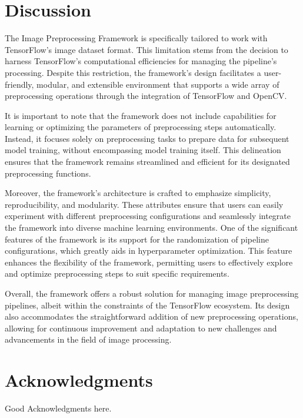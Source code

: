 \documentclass[journal ]{new-aiaa}
\begin{document}
\section{Discussion}
The Image Preprocessing Framework is specifically tailored to work with TensorFlow's image dataset format. This limitation stems from the decision to harness TensorFlow's computational efficiencies for managing the pipeline's processing. Despite this restriction, the framework's design facilitates a user-friendly, modular, and extensible environment that supports a wide array of preprocessing operations through the integration of TensorFlow and OpenCV.

It is important to note that the framework does not include capabilities for learning or optimizing the parameters of preprocessing steps automatically. Instead, it focuses solely on preprocessing tasks to prepare data for subsequent model training, without encompassing model training itself. This delineation ensures that the framework remains streamlined and efficient for its designated preprocessing functions.

Moreover, the framework's architecture is crafted to emphasize simplicity, reproducibility, and modularity. These attributes ensure that users can easily experiment with different preprocessing configurations and seamlessly integrate the framework into diverse machine learning environments. One of the significant features of the framework is its support for the randomization of pipeline configurations, which greatly aids in hyperparameter optimization. This feature enhances the flexibility of the framework, permitting users to effectively explore and optimize preprocessing steps to suit specific requirements.

Overall, the framework offers a robust solution for managing image preprocessing pipelines, albeit within the constraints of the TensorFlow ecosystem. Its design also accommodates the straightforward addition of new preprocessing operations, allowing for continuous improvement and adaptation to new challenges and advancements in the field of image processing.



\section*{Acknowledgments}
Good Acknowledgments here.


\end{document}
